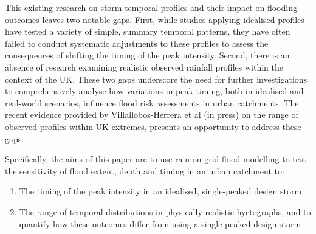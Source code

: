 \documentclass[APA,Times2COL]{WileyNJDv5}
\begin{document}
This existing research on storm temporal profiles and their impact on flooding outcomes leaves two notable gaps. First, while studies applying idealised profiles have tested a variety of simple, summary temporal patterns, they have often failed to conduct systematic adjustments to these profiles to assess the consequences of shifting the timing of the peak intensity. Second, there is an absence of research examining realistic observed rainfall profiles within the context of the UK. These two gaps underscore the need for further investigations to comprehensively analyse how variations in peak timing, both in idealised and real-world scenarios, influence flood risk assessments in urban catchments. The recent evidence provided by Villallobos-Herrera et al (in press) on the range of observed profiles within UK extremes, presents an opportunity to address these gaps. 

Specifically, the aims of this paper are to use rain-on-grid flood modelling to test the sensitivity of flood extent, depth and timing in an urban catchment to:

\begin{enumerate}
  \item The timing of the peak intensity in an idealised, single-peaked design storm 
  \item The range of temporal distributions in physically realistic hyetographs, and to quantify how these outcomes differ from using a single-peaked design storm 
\end{enumerate}
\end{document}
